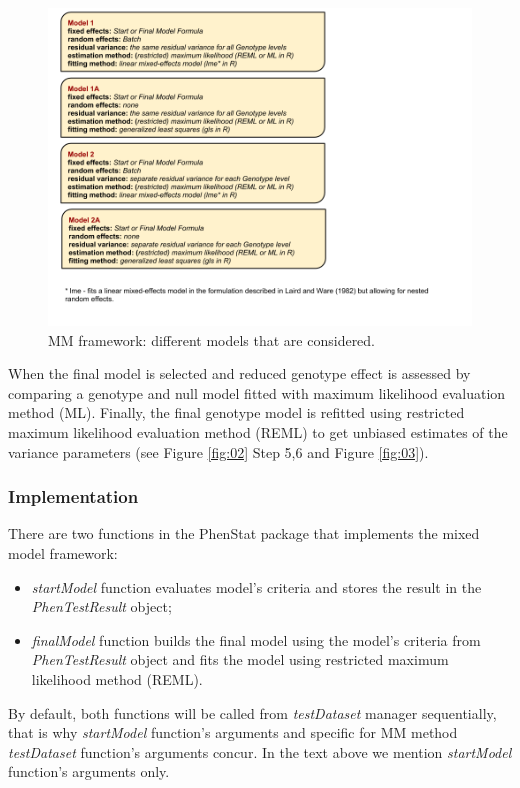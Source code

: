 \documentclass[12pt,a4paper]{article}
\begin{document}
\begin{figure}[!tpb]%
\centerline{\includegraphics[scale=0.5]{Mixed_Models.png}}
\caption{MM framework: different models that are considered. }\label{fig:04}
\end{figure}

When the final model is selected and reduced genotype effect is assessed by comparing a genotype and null model fitted with maximum likelihood evaluation method (ML). Finally, the final genotype model is refitted using restricted maximum likelihood evaluation method (REML) to get unbiased estimates of the variance parameters (see Figure \ref{fig:02} Step 5,6 and Figure \ref{fig:03}).   

\subsubsection{Implementation}
\label{sec:MMImplementation}
There are two functions in the PhenStat package that implements the mixed model framework:
\begin{itemize}
\item \textit{startModel} function evaluates model's criteria and stores the result in the \textit{PhenTestResult} object;
\item \textit{finalModel} function builds the final model using the model's criteria from \textit{PhenTestResult} object and fits the model using restricted maximum likelihood method (REML). 
\end{itemize}

By default, both functions will be called from \textit{testDataset} manager sequentially, that is why \textit{startModel} function's arguments and specific for MM method \textit{testDataset} function's arguments concur.
In the text above we mention \textit{startModel} function's arguments only. 
\end{document}
